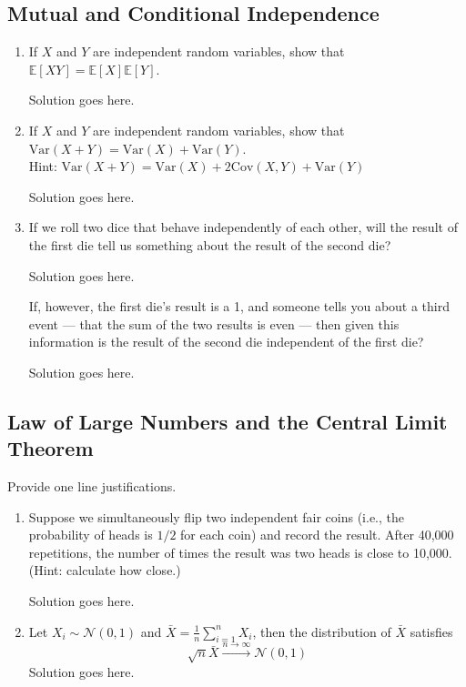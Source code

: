 \documentclass[a4paper]{article}
\theoremstyle{definition}
\newcommand{\Var}{\mathrm{Var}}
\newcommand{\Cov}{\mathrm{Cov}}
\newenvironment{soln}{
    \leavevmode\color{blue}\ignorespaces
}{}
\begin{document}
\subsection{Mutual and Conditional Independence}
\begin{enumerate}
\item If $X$ and $Y$ are independent random variables, show that
  $\mathbb{E}[XY] = \mathbb{E}[X]\mathbb{E}[Y]$.
  
  \begin{soln}  Solution goes here. \end{soln}
  
\item If $X$ and $Y$ are independent random variables, show that
  $\Var(X+Y) = \Var(X) + \Var(Y)$. \\
  Hint: $\Var(X+Y) = \Var(X) + 2\Cov(X, Y) + \Var(Y)$
  
  \begin{soln}  Solution goes here. \end{soln}
 
\item If we roll two dice that behave independently of each
  other, will the result of the first die tell us something about the
  result of the second die? 
  
  \begin{soln}  Solution goes here. \end{soln}
  
  If, however, the first die's result is a 1,
  and someone tells you about a third event --- that the sum of the two
  results is even --- then given this information is the result of the second die
  independent of the first die? 
  
  \begin{soln}  Solution goes here. \end{soln}
\end{enumerate}

\subsection{Law of Large Numbers and the Central Limit Theorem}
Provide one line justifications.
\begin{enumerate}
\item Suppose we simultaneously flip two independent fair coins (i.e., the probability of heads is $1/2$ for each coin)
  and record the result. After 40,000 repetitions, the number
  of times the result was two heads is close to 10,000.  (Hint: calculate how close.)
  
  \begin{soln}  Solution goes here. \end{soln}
  
\item Let $X_i\sim\mathcal{N}(0, 1)$ and $\bar{X} = \frac{1}{n}\sum_{i=1}^n X_i$, then the distribution of $\bar{X}$ satisfies 
  $$\sqrt{n}\bar{X}\overset{n\rightarrow\infty}{\longrightarrow}\mathcal{N}(0, 1)$$
  \begin{soln}  Solution goes here. \end{soln}
  
\end{enumerate}
\end{document}
